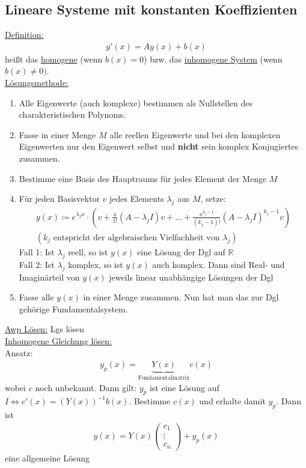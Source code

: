 \subsection{Lineare Systeme mit konstanten Koeffizienten}
\underline{Definition:}
\begin{align*}
    y'(x) = Ay(x) + b(x)
\end{align*}
heißt das \underline{homogene} (wenn $b(x) = 0$) bzw. das \underline{inhomogene System} (wenn $b(x) \neq 0)$. \\
\underline{Lösungsmethode:}
\begin{enumerate}
    \item Alle Eigenwerte (auch komplexe) bestimmen als Nullstellen des charakteristischen Polynoms.
    \item Fasse in einer Menge $M$ alle reellen Eigenwerte und bei den komplexen Eigenwerten nur den Eigenwert selbst und \textbf{nicht} sein komplex Konjugiertes zusammen.
    \item Bestimme eine Basis des Hauptraums für jedes Element der Menge $M$
    \item Für jeden Basisvektor $v$ jedes Elements $\lambda_j$ aus $M$, setze:
    \begin{align*}
        y(x) \coloneqq e^{\lambda_jx} \cdot (v+\frac{x}{1!}(A-\lambda_jI)v+ \ldots + \frac{x^{k_j-1}}{(k_j-1)!}(A-\lambda_jI)^{k_j-1}v) \\
        (k_j  \text{ entspricht der algebraischen Vielfachheit von }\lambda_j)
    \end{align*}
    Fall 1: Ist $\lambda_j$ reell, so ist $y(x)$ eine Lösung der Dgl auf $\mathbb{R}$ \\
    Fall 2: Ist $\lambda_j$ komplex, so ist $y(x)$ auch komplex. Dann sind Real- und Imaginärteil von $y(x)$ jeweils linear unabhängige Lösungen der Dgl
    \item Fasse alle $y(x)$ in einer Menge zusammen. Nun hat man das zur Dgl gehörige Fundamentalsystem.
\end{enumerate}
\underline{Awp Lösen:} Lgs lösen \\
\underline{Inhomogene Gleichung lösen:} \\
Ansatz: 
\begin{align*}
    y_p(x) = \underbrace{Y(x)}_{\text{Fundamentalmatrix}}c(x) 
\end{align*}
wobei $c$ noch unbekannt. Dann gilt: $y_p$ ist eine Lösung auf $I \Leftrightarrow c'(x)=(Y(x))^{-1}b(x)$. Bestimme $c(x)$ und erhalte damit $y_p$.
Dann ist 
\begin{align*}
    y(x) = Y(x) \begin{pmatrix} c_1 \\ \vdots \\ c_n\end{pmatrix} + y_p(x)
\end{align*}
eine allgemeine Lösung